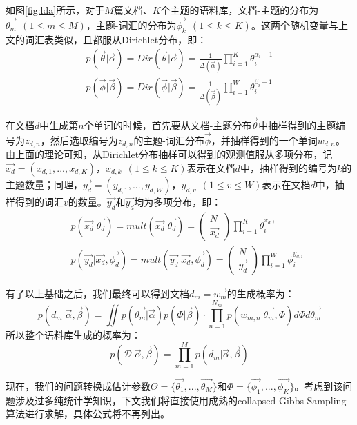 如图\ref{fig:lda}所示，对于$M$篇文档、$K$个主题的语料库，文档-主题的分布为$\vec{\theta_m}~~(1\le m\le M)$，主题-词汇的分布为$\vec{\phi_k}~~(1\le k\le K)$。这两个随机变量与上文的词汇表类似，且都服从Dirichlet分布，即：
\begin{eqnarray}
  p(\vec{\theta}|\vec{\alpha})=Dir(\vec{\theta}|\vec{\alpha})=\frac{1}{\Delta(\vec{\alpha})}\prod_{i=1}^{K}\theta_{i}^{\alpha_i-1} \\
  p(\vec{\phi}|\vec{\beta})=Dir(\vec{\phi}|\vec{\beta})=\frac{1}{\Delta(\vec{\beta})}\prod_{i=1}^{W}\theta_{i}^{\beta_i-1}
\end{eqnarray}

在文档$d$中生成第$n$个单词的时候，首先要从文档-主题分布$\vec{\theta}$中抽样得到的主题编号为$z_{d,n}$，然后选取编号为$z_{d,n}$的主题-词汇分布$\vec{\phi}$，并抽样得到的一个单词$w_{d,n}$。由上面的理论可知，从Dirichlet分布抽样可以得到的观测值服从多项分布，记$\vec{x_d}=(x_{d,1},...,x_{d,K})$，$x_{d,k}~~(1\le k\le K)$表示在文档$d$中，抽样得到的编号为$k$的主题数量；同理，$\vec{y_d}=(y_{d,1},...,y_{d,W})$，$y_{d,v}~~(1\le v\le W)$表示在文档$d$中，抽样得到的词汇$v$的数量。$\vec{y_d}$和$\vec{y_d}$均为多项分布，即：
\begin{eqnarray}
  &&p(\vec{x_d}|\vec{\theta_d})=mult(\vec{x_d}|\vec{\theta_d})=
  \begin{pmatrix}
    N \\ \vec{x_d}
  \end{pmatrix}
  \prod_{i=1}^{K}\theta_i^{x_{d,i}} \\
  &&p(\vec{y_d}|\vec{x_d},\vec{\phi_d})=mult(\vec{y_d}|\vec{x_d},\vec{\phi_d})=
  \begin{pmatrix}
    N \\ \vec{y_d}
  \end{pmatrix}
  \prod_{i=1}^{W}\phi_i^{y_{d,i}}
\end{eqnarray}

有了以上基础之后，我们最终可以得到文档$d_m=\vec{w_m}$的生成概率为\cite{heinrich2005parameter}：
\begin{equation}
  p(d_m|\vec{\alpha},\vec{\beta})=\iint p(\vec{\theta_m}|\vec{\alpha})p(\Phi|\vec{\beta})\cdot \prod_{n=1}^{N_m}p(w_{m,n}|\vec{\theta_m},\Phi)d\Phi d\vec{\theta_m}
\end{equation}
所以整个语料库生成的概率为：
\begin{equation}
  p(\mathcal{D}|\vec{\alpha},\vec{\beta})=\prod_{m=1}^{M}p(d_m|\vec{\alpha},\vec{\beta})
\end{equation}

现在，我们的问题转换成估计参数$\Theta=\{\vec{\theta_1},...,\vec{\theta_M}\}$和$\Phi=\{\vec{\phi_1},...,\vec{\phi_K}\}$。考虑到该问题涉及过多纯统计学知识，下文我们将直接使用成熟的collapsed Gibbs Sampling算法\cite{griffiths2004finding}进行求解，具体公式将不再列出。

